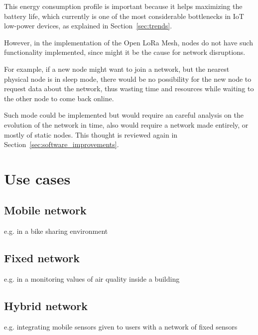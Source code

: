		This energy consumption profile is important because it helps maximizing the battery life, which currently is one of the most considerable bottlenecks in IoT low-power devices, as explained in Section~\ref{sec:trends}.
		
		However, in the implementation of the Open LoRa Mesh, nodes do not have such functionality implemented, since might it be the cause for network disruptions.
		
		For example, if a new node might want to join a network, but the nearest physical node is in sleep mode, there would be no possibility for the new node to request data about the network, thus wasting time and resources while waiting to the other node to come back online.
		
		Such mode could be implemented but would require an careful analysis on the evolution of the network in time, also would require a network made entirely, or mostly of static nodes.
		This thought is reviewed again in Section~\ref{sec:software_improvements}.
			
	\section{Use cases}
		
		\subsection{Mobile network}
		
			e.g. in a bike sharing environment
		
		\subsection{Fixed network}
		
			e.g. in a monitoring values of air quality inside a building
		
		\subsection{Hybrid network}
		
			e.g. integrating mobile sensors given to users with a network of fixed sensors